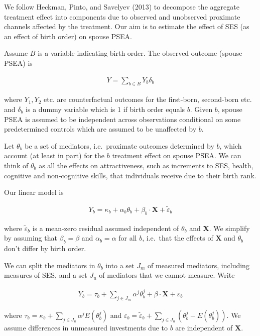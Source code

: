 \documentclass[
]{article}
\begin{document}
We follow Heckman, Pinto, and Savelyev (2013) to decompose the aggregate treatment
effect into components due to observed and unobserved proximate channels
affected by the treatment. Our aim is to estimate the effect of SES (as
an effect of birth order) on spouse PSEA.

Assume \(B\) is a variable indicating birth order. The observed outcome
(spouse PSEA) is

\begin{align}
\label{eq:Y}
Y = \sum_{b \in B}Y_b\delta_b
\end{align}

where \(Y_1, Y_2\) etc. are counterfactual outcomes for the first-born,
second-born etc. and \(\delta_b\) is a dummy variable which is 1 if birth
order equals \(b\). Given \(b\), spouse PSEA is assumed to be independent
across observations conditional on some predetermined controls which are
assumed to be unaffected by \(b\).

Let \(\theta_b\) be a set of mediators, i.e.~proximate outcomes determined
by \(b\), which account (at least in part) for the \(b\) treatment effect on
spouse PSEA. We can think of \(\theta_b\) as all the effects on
attractiveness, such as increments to SES, health, cognitive and
non-cognitive skills, that individuals receive due to their birth rank.

Our linear model is

\begin{align}
\label{eq:Yb}
Y_b = \kappa_b + \alpha_b\theta_b + \beta_b \cdot \mathbf{X} + \tilde{\varepsilon}_b
\end{align}

where \(\tilde{\varepsilon}_b\) is a mean-zero residual assumed
independent of \(\theta_b\) and \(\mathbf{X}\). We simplify by assuming that
\(\beta_b = \beta\) and \(\alpha_b = \alpha\) for all \(b\), i.e.~that the
effects of \(\mathbf{X}\) and \(\theta_b\) don't differ by birth order.

We can split the mediators in \(\theta_b\) into a set \(J_m\) of measured
mediators, including measures of SES, and a set \(J_u\) of mediators that
we cannot measure. Write

\begin{align}
\label{eq:Yb2}
Y_b = \tau_b + \sum_{j \in J_m} \alpha^j \theta^j_b + \beta \cdot \mathbf{X} + \varepsilon_b
\end{align}

where \(\tau_b = \kappa_b + \sum_{j \in J_u} \alpha^j E(\theta^j_b)\) and
\(\varepsilon_b = \tilde{\varepsilon}_b + \sum_{j \in J_u} (\theta^j_b - E(\theta^j_b))\).
We assume differences in unmeasured investments due to \(b\) are
independent of \(\mathbf{X}\).
\end{document}
